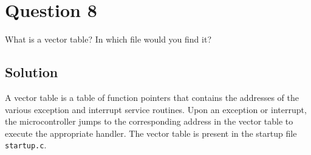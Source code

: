 \section*{Question 8}

What is a vector table?
In which file would you find it?

\subsection*{Solution}

A vector table is a table of function pointers that contains the addresses of the various exception and interrupt service routines.
Upon an exception or interrupt, the microcontroller jumps to the corresponding address in the vector table to execute the appropriate handler.
The vector table is present in the startup file \texttt{startup.c}.
